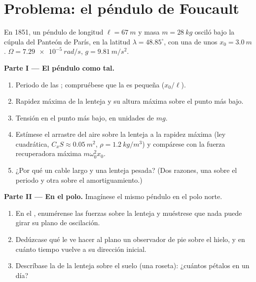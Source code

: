 \section{Problema: el péndulo de Foucault}

\begin{problem}
\label{pb:b1:non-inertial-frames:1}
En 1851, un péndulo de longitud $\ell = \qty{67}{m}$ y masa $m = \qty{28}{kg}$
osciló bajo la cúpula del Panteón de París, en la latitud $\lambda =
48.85^\circ$, con una  de unos $x_0 = \qty{3.0}{m}$. $\Omega =
\qty{7.29e-5}{rad/s}$, $g = \qty{9.81}{m/s^2}$.

\medskip
\noindent\textbf{Parte I --- El péndulo como tal.}
\begin{enumerate}
  \item Periodo de las ; compruébese que la 
        es pequeña ($x_0/\ell$).
  \item Rapidez máxima de la lenteja y su altura máxima sobre el punto más
        bajo.
  \item Tensión en el punto más bajo, en unidades de $mg$.
  \item Estímese el arrastre del aire sobre la lenteja a la rapidez máxima
        (ley cuadrática, $C_xS \approx \qty{0.05}{m^2}$, $\rho = \qty{1.2}{kg/m^3}$)
        y compárese con la fuerza recuperadora máxima $m\omega_0^2x_0$.
  \item ¿Por qué un cable largo y una lenteja pesada? (Dos razones, una
        sobre el periodo y otra sobre el amortiguamiento.)
\end{enumerate}

\medskip
\noindent\textbf{Parte II --- En el polo.}
Imagínese el mismo péndulo en el polo norte.
\begin{enumerate}[resume]
  \item En el , enumérense las fuerzas sobre la lenteja
        y muéstrese que nada puede girar su plano de oscilación.
  \item Dedúzcase qué le ve hacer al plano un observador de pie sobre el
        hielo, y en cuánto tiempo vuelve a su dirección inicial.
  \item Descríbase la  de la lenteja sobre el suelo (una
        roseta): ¿cuántos pétalos en un día?
\end{enumerate}


\end{problem}
